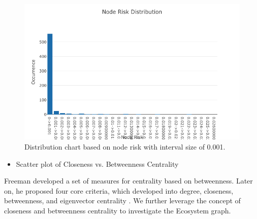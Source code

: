 \documentclass[conference]{IEEEtran}
\begin{document}
\begin{figure}[ht!]
  \includegraphics[width=\linewidth]{node_risk_distribution.png}
  \caption{Distribution chart based on node risk with interval size of 0.001.}
  \label{fig:node_risk_distribution}
\end{figure}

\begin{itemize}
\item Scatter plot of Closeness vs. Betweenness Centrality
\end{itemize}

Freeman \cite{Freeman78centralityin} developed a set of measures for centrality based on betweenness. Later on, he proposed four core criteria, which developed into degree, closeness, betweenness, and eigenvector centrality  \cite{Freeman79centralityin}. We further leverage the concept of closeness and betweenness centrality to investigate the Ecosystem graph.
\end{document}
